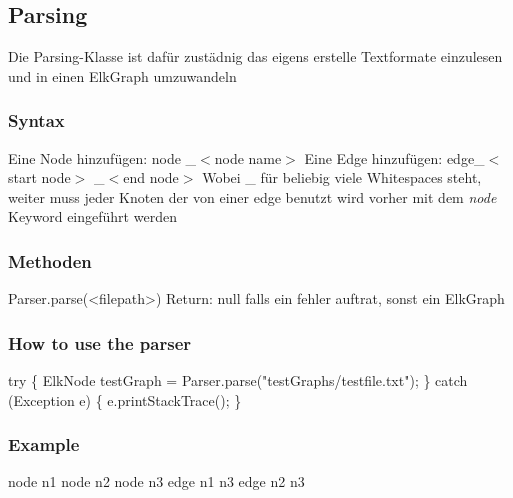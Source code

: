 



\subsection*{Parsing}
Die Parsing-Klasse ist dafür zustädnig das eigens erstelle Textformate einzulesen
und in einen ElkGraph umzuwandeln

\subsubsection*{Syntax}
Eine Node hinzufügen:
\newline
\tab[0.5cm]  node \_$<$node name$>$
\newline
\newline
Eine Edge hinzufügen:\newline
\tab[0.5cm]  edge\_$<$start node$>$ \_$<$end node$>$
\newline
Wobei \_ für beliebig viele Whitespaces steht,
weiter muss jeder Knoten der von einer edge benutzt wird vorher mit dem \textit{node} Keyword eingeführt werden

\subsubsection*{Methoden}
Parser.parse(<filepath>)\newline
Return: null falls ein fehler auftrat, sonst ein ElkGraph

\subsubsection*{How to use the parser}
try 
\{\newline
ElkNode testGraph = Parser.parse("testGraphs/testfile.txt");
\newline
\}
\newline
catch (Exception e)
\newline
\{
\newline
  e.printStackTrace(); 
\newline
\}


\subsubsection*{Example}
node n1 \newline
node n2 \newline
node n3 \newline
\newline
\newline
edge n1 n3\newline 
edge n2 n3 \newline









